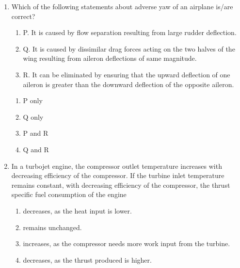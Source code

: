 \documentclass{article}
\begin{document}
\begin{enumerate}[leftmargin=*, resume]
Use the weak shock solution from the \(\theta\)-\(\beta\)-M plot shown in Figure 2 to choose the correct option from the following.
\begin{multicols}{4}
\begin{enumerate}
\item \(\beta_1 > \beta_2\)
\item \(\beta_1 < \beta_2\)
\item \(\theta_1 > \theta_2\)
\item \(\theta_1 < \theta_2\)
\end{enumerate}
\end{multicols}

\item Which of the following statements about adverse yaw of an airplane is/are correct?
\begin{enumerate}
\item P. It is caused by flow separation resulting from large rudder deflection.
\item Q. It is caused by dissimilar drag forces acting on the two halves of the wing resulting from aileron deflections of same magnitude.
\item R. It can be eliminated by ensuring that the upward deflection of one aileron is greater than the downward deflection of the opposite aileron.
\end{enumerate}
\begin{multicols}{4}
\begin{enumerate}
\item P only
\item Q only
\item P and R
\item Q and R
\end{enumerate}
\end{multicols}

\item In a turbojet engine, the compressor outlet temperature increases with decreasing efficiency of the compressor. If the turbine inlet temperature remains constant, with decreasing efficiency of the compressor, the thrust specific fuel consumption of the engine
\begin{multicols}{2}
\begin{enumerate}
\item decreases, as the heat input is lower.
\item remains unchanged.
\item increases, as the compressor needs more work input from the turbine.
\item decreases, as the thrust produced is higher.
\end{enumerate}
\end{multicols}


\end{enumerate}
\end{document}
